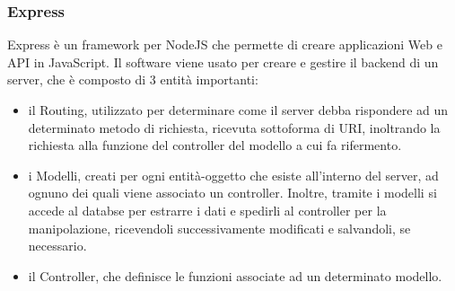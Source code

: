 \subsubsection{Express}
Express \`e un framework per NodeJS che permette di creare applicazioni Web e API in JavaScript.
Il software viene usato per creare e gestire il backend di un server, che \`e composto di 3 entit\`a importanti:
\begin{itemize}
\item il Routing, utilizzato per determinare come il server debba rispondere ad un determinato metodo di richiesta,
ricevuta sottoforma di URI, inoltrando la richiesta alla funzione del controller del modello a cui fa rifermento.
\item i Modelli, creati per ogni entit\`a-oggetto che esiste all'interno del server, ad ognuno dei quali viene associato
un controller. Inoltre, tramite i modelli si accede al databse per estrarre i dati e spedirli al controller per
la manipolazione, ricevendoli successivamente modificati e salvandoli, se necessario.
\item il Controller, che definisce le funzioni associate ad un determinato modello.
\\[2\baselineskip]
\end{itemize}

